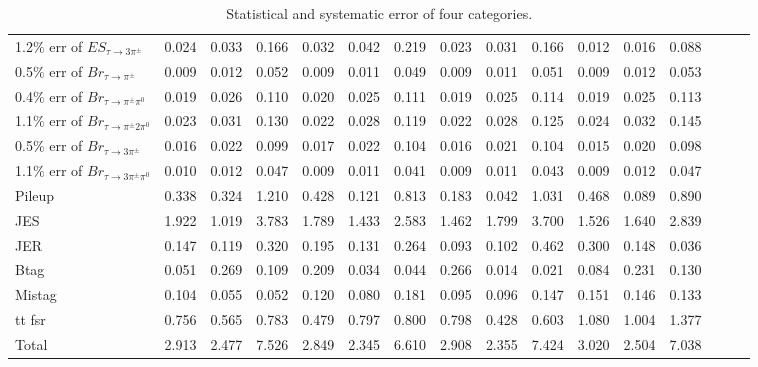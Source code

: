 \begin{sidewaystable}[p]
\begin{tabular}{|l|ccc|ccc|ccc|ccc|ccc|}
  1.2$\%$ err of $ES_{\tau\to3\pi^\pm}$      & 0.024 & 0.033 & 0.166 & 0.032 & 0.042 & 0.219 & 0.023 & 0.031 & 0.166 & 0.012 & 0.016 & 0.088 \\ 
  0.5$\%$ err of $Br_{\tau\to\pi^\pm}$       & 0.009 & 0.012 & 0.052 & 0.009 & 0.011 & 0.049 & 0.009 & 0.011 & 0.051 & 0.009 & 0.012 & 0.053 \\ 
  0.4$\%$ err of $Br_{\tau\to\pi^\pm\pi^0}$  & 0.019 & 0.026 & 0.110 & 0.020 & 0.025 & 0.111 & 0.019 & 0.025 & 0.114 & 0.019 & 0.025 & 0.113 \\ 
  1.1$\%$ err of $Br_{\tau\to\pi^\pm2\pi^0}$ & 0.023 & 0.031 & 0.130 & 0.022 & 0.028 & 0.119 & 0.022 & 0.028 & 0.125 & 0.024 & 0.032 & 0.145 \\ 
  0.5$\%$ err of $Br_{\tau\to3\pi^\pm}$      & 0.016 & 0.022 & 0.099 & 0.017 & 0.022 & 0.104 & 0.016 & 0.021 & 0.104 & 0.015 & 0.020 & 0.098 \\ 
  1.1$\%$ err of $Br_{\tau\to3\pi^\pm\pi^0}$ & 0.010 & 0.012 & 0.047 & 0.009 & 0.011 & 0.041 & 0.009 & 0.011 & 0.043 & 0.009 & 0.012 & 0.047 \\ 
  Pileup                                     & 0.338 & 0.324 & 1.210 & 0.428 & 0.121 & 0.813 & 0.183 & 0.042 & 1.031 & 0.468 & 0.089 & 0.890 \\ 
  JES                                        & 1.922 & 1.019 & 3.783 & 1.789 & 1.433 & 2.583 & 1.462 & 1.799 & 3.700 & 1.526 & 1.640 & 2.839 \\ 
  JER                                        & 0.147 & 0.119 & 0.320 & 0.195 & 0.131 & 0.264 & 0.093 & 0.102 & 0.462 & 0.300 & 0.148 & 0.036 \\ 
  Btag                                       & 0.051 & 0.269 & 0.109 & 0.209 & 0.034 & 0.044 & 0.266 & 0.014 & 0.021 & 0.084 & 0.231 & 0.130 \\ 
  Mistag                                     & 0.104 & 0.055 & 0.052 & 0.120 & 0.080 & 0.181 & 0.095 & 0.096 & 0.147 & 0.151 & 0.146 & 0.133 \\ 
  tt fsr                                     & 0.756 & 0.565 & 0.783 & 0.479 & 0.797 & 0.800 & 0.798 & 0.428 & 0.603 & 1.080 & 1.004 & 1.377 \\ 
  \hline
  Total                                      & 2.913 & 2.477 & 7.526 & 2.849 & 2.345 & 6.610 & 2.908 & 2.355 & 7.424 & 3.020 & 2.504 & 7.038 \\ 
  \hline
  \end{tabular}
  \caption{ Statistical and systematic error of four categories. }
  \label{tab:syst_alt}
\end{sidewaystable}
